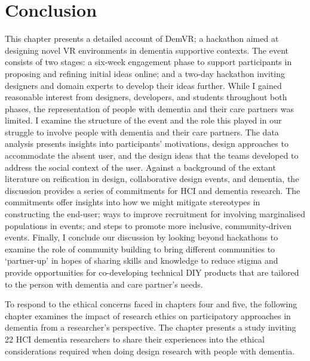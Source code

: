 \section{Conclusion}
\label{sec:Conclusion}
This chapter presents a detailed account of DemVR; a hackathon aimed at designing novel VR environments in dementia supportive contexts. The event consists of two stages: a six-week engagement phase to support participants in proposing and refining initial ideas online; and a two-day hackathon inviting designers and domain experts to develop their ideas further. While I gained reasonable interest from designers, developers, and students throughout both phases, the representation of people with dementia and their care partners was limited. I examine the structure of the event and the role this played in our struggle to involve people with dementia and their care partners. The data analysis presents insights into participants’ motivations, design approaches to accommodate the absent user, and the design ideas that the teams developed to address the social context of the user. Against a background of the extant literature on reification in design, collaborative design events, and dementia, the discussion provides a series of commitments for HCI and dementia research. The commitments offer insights into how we might mitigate stereotypes in constructing the end-user; ways to improve recruitment for involving marginalised populations in events; and steps to promote more inclusive, community-driven events. Finally, I conclude our discussion by looking beyond hackathons to examine the role of community building to bring different communities to ‘partner-up’ in hopes of sharing skills and knowledge to reduce stigma and provide opportunities for co-developing technical DIY products that are tailored to the person with dementia and care partner’s needs.

To respond to the ethical concerns faced in chapters four and five, the following chapter examines the impact of research ethics on participatory approaches in dementia from a researcher's perspective. The chapter presents a study inviting 22 HCI dementia researchers to share their experiences into the ethical considerations required when doing design research with people with dementia.



